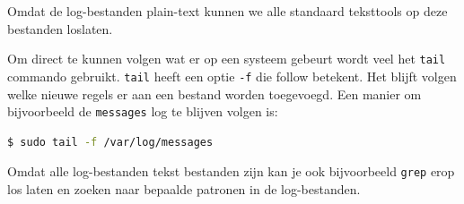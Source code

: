 Omdat de log-bestanden plain-text kunnen we alle standaard teksttools op deze bestanden loslaten.

Om direct te kunnen volgen wat er op een systeem gebeurt wordt veel het \texttt{tail} commando gebruikt. \texttt{tail} heeft een optie \texttt{-f} die follow betekent. Het blijft volgen welke nieuwe regels er aan een bestand worden toegevoegd. Een manier om bijvoorbeeld de \texttt{messages} log te blijven volgen is:
\begin{lstlisting}[language=bash]
$ sudo tail -f /var/log/messages
\end{lstlisting}

Omdat alle log-bestanden tekst bestanden zijn kan je ook bijvoorbeeld \texttt{grep} erop los laten en zoeken naar bepaalde patronen in de log-bestanden.

